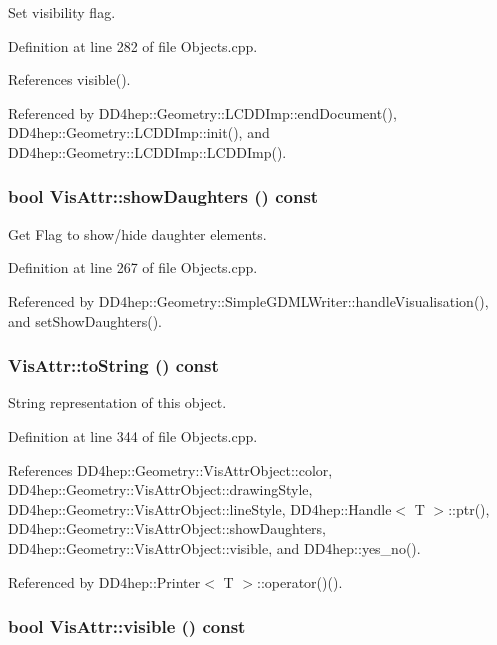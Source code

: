 Set visibility flag. 

Definition at line 282 of file Objects.cpp.

References visible().

Referenced by DD4hep::Geometry::LCDDImp::endDocument(), DD4hep::Geometry::LCDDImp::init(), and DD4hep::Geometry::LCDDImp::LCDDImp().\hypertarget{class_d_d4hep_1_1_geometry_1_1_vis_attr_af782d624f358b2a86900ff588841d453}{
\subsubsection[{showDaughters}]{\setlength{\rightskip}{0pt plus 5cm}bool VisAttr::showDaughters () const}}
\label{class_d_d4hep_1_1_geometry_1_1_vis_attr_af782d624f358b2a86900ff588841d453}


Get Flag to show/hide daughter elements. 

Definition at line 267 of file Objects.cpp.

Referenced by DD4hep::Geometry::SimpleGDMLWriter::handleVisualisation(), and setShowDaughters().\hypertarget{class_d_d4hep_1_1_geometry_1_1_vis_attr_a020d26d02871cee31c187d749f90d308}{
\subsubsection[{toString}]{ VisAttr::toString () const}}
\label{class_d_d4hep_1_1_geometry_1_1_vis_attr_a020d26d02871cee31c187d749f90d308}


String representation of this object. 

Definition at line 344 of file Objects.cpp.

References DD4hep::Geometry::VisAttrObject::color, DD4hep::Geometry::VisAttrObject::drawingStyle, DD4hep::Geometry::VisAttrObject::lineStyle, DD4hep::Handle$<$ T $>$::ptr(), DD4hep::Geometry::VisAttrObject::showDaughters, DD4hep::Geometry::VisAttrObject::visible, and DD4hep::yes\_\-no().

Referenced by DD4hep::Printer$<$ T $>$::operator()().\hypertarget{class_d_d4hep_1_1_geometry_1_1_vis_attr_a073240f217a17b7f23b30ad036b88f01}{
\subsubsection[{visible}]{\setlength{\rightskip}{0pt plus 5cm}bool VisAttr::visible () const}}
\label{class_d_d4hep_1_1_geometry_1_1_vis_attr_a073240f217a17b7f23b30ad036b88f01}


